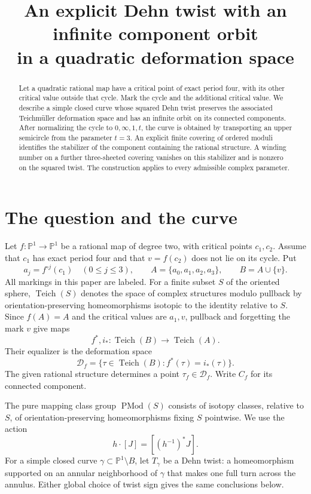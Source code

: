\documentclass[11pt]{article}
\title{An explicit Dehn twist with an infinite component orbit\\in a quadratic deformation space}
\author{}
\date{}
\newcommand{\Pone}{\mathbb P^1}
\newcommand{\Teich}{\operatorname{Teich}}
\newcommand{\Mod}{\operatorname{PMod}}
\newcommand{\D}{\mathcal D}
\theoremstyle{remark}
\begin{document}
\maketitle
\begin{abstract}
Let a quadratic rational map have a critical point of exact period four, with its other critical value outside that cycle. Mark the cycle and the additional critical value. We describe a simple closed curve whose squared Dehn twist preserves the associated Teichm\"uller deformation space and has an infinite orbit on its connected components. After normalizing the cycle to $0,\infty,1,t$, the curve is obtained by transporting an upper semicircle from the parameter $t=3$. An explicit finite covering of ordered moduli identifies the stabilizer of the component containing the rational structure. A winding number on a further three-sheeted covering vanishes on this stabilizer and is nonzero on the squared twist. The construction applies to every admissible complex parameter.
\end{abstract}

\section{The question and the curve}
Let $f:\Pone\to\Pone$ be a rational map of degree two, with critical points $c_1,c_2$. Assume that $c_1$ has exact period four and that $v=f(c_2)$ does not lie on its cycle. Put
\[
 a_j=f^{\circ j}(c_1)\quad(0\leq j\leq3),\qquad
 A=\{a_0,a_1,a_2,a_3\},\qquad B=A\cup\{v\}.
\]
All markings in this paper are labeled. For a finite subset $S$ of the oriented sphere, $\Teich(S)$ denotes the space of complex structures modulo pullback by orientation-preserving homeomorphisms isotopic to the identity relative to $S$. Since $f(A)=A$ and the critical values are $a_1,v$, pullback and forgetting the mark $v$ give maps
\[
 f^*,i_*:\Teich(B)\longrightarrow\Teich(A).
\]
Their equalizer is the deformation space
\begin{equation}\label{eq:def}
 \D_f=\{\tau\in\Teich(B):f^*(\tau)=i_*(\tau)\}.
\end{equation}
The given rational structure determines a point $\tau_f\in\D_f$. Write $C_f$ for its connected component.

The pure mapping class group $\Mod(S)$ consists of isotopy classes, relative to $S$, of orientation-preserving homeomorphisms fixing $S$ pointwise. We use the action
\[
 h\cdot[J]=[(h^{-1})^*J].
\]
For a simple closed curve $\gamma\subset\Pone\setminus B$, let $T_\gamma$ be a Dehn twist: a homeomorphism supported on an annular neighborhood of $\gamma$ that makes one full turn across the annulus. Either global choice of twist sign gives the same conclusions below.
\end{document}
